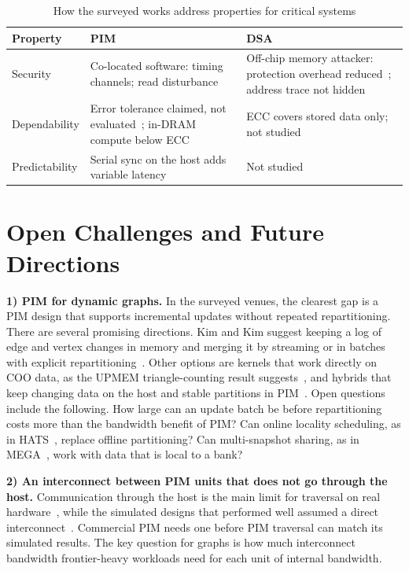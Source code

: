 \documentclass[journal,onecolumn]{IEEEtran}
\begin{document}
\begin{table}[t]
\caption{How the surveyed works address properties for critical systems}
\label{tab:critical}
\centering\footnotesize
\begin{tabularx}{\columnwidth}{@{}L{2.6cm}YY@{}}
\toprule
Property & PIM & DSA \\
\midrule
Security & Co-located software: timing channels; read disturbance~\cite{bostanci2025impact,yuksel2026pid} & Off-chip memory attacker: protection overhead reduced~\cite{hua2022mgx}; address trace not hidden \\
Dependability & Error tolerance claimed, not evaluated~\cite{song2018graphr}; in-DRAM compute below ECC & ECC covers stored data only; not studied \\
Predictability & Serial sync on the host adds variable latency~\cite{gomezluna2022prim} & Not studied \\
\bottomrule
\end{tabularx}
\end{table}

\section{Open Challenges and Future Directions}\label{sec:open}
\textbf{1) PIM for dynamic graphs.} In the surveyed venues, the clearest gap is a PIM design that supports incremental updates without repeated repartitioning. There are several promising directions. Kim and Kim suggest keeping a log of edge and vertex changes in memory and merging it by streaming or in batches with explicit repartitioning~\cite{kim2020dynamic}. Other options are kernels that work directly on COO data, as the UPMEM triangle-counting result suggests~\cite{asquini2025tc}, and hybrids that keep changing data on the host and stable partitions in PIM~\cite{shin2025fala}. Open questions include the following. How large can an update batch be before repartitioning costs more than the bandwidth benefit of PIM? Can online locality scheduling, as in HATS~\cite{mukkara2018hats}, replace offline partitioning? Can multi-snapshot sharing, as in MEGA~\cite{gao2023mega}, work with data that is local to a bank?

\textbf{2) An interconnect between PIM units that does not go through the host.} Communication through the host is the main limit for traversal on real hardware~\cite{gomezluna2022prim,barkhordar2025alphapim}, while the simulated designs that performed well assumed a direct interconnect~\cite{ahn2015tesseract,zhuo2019graphq}. Commercial PIM needs one before PIM traversal can match its simulated results. The key question for graphs is how much interconnect bandwidth frontier-heavy workloads need for each unit of internal bandwidth.
\end{document}
